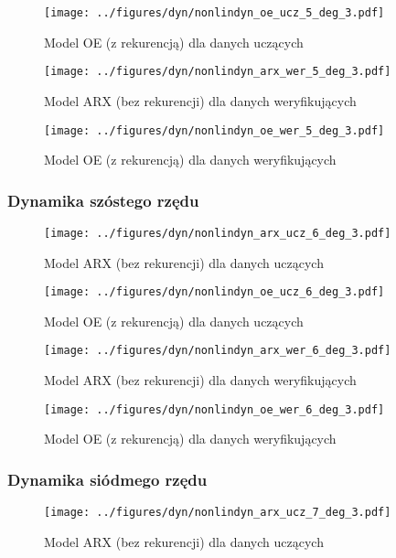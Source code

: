\documentclass[a4paper,titlepage,11pt,floatssmall]{mwrep}
\begin{document}
\begin{figure}[H]
\centering
\texttt{[image: ../figures/dyn/nonlindyn\_oe\_ucz\_5\_deg\_3.pdf]}
\caption{Model OE (z rekurencją) dla danych uczących}
\end{figure}

\begin{figure}[H]
\centering
\texttt{[image: ../figures/dyn/nonlindyn\_arx\_wer\_5\_deg\_3.pdf]}
\caption{Model ARX (bez rekurencji) dla danych weryfikujących}
\end{figure}

\begin{figure}[H]
\centering
\texttt{[image: ../figures/dyn/nonlindyn\_oe\_wer\_5\_deg\_3.pdf]}
\caption{Model OE (z rekurencją) dla danych weryfikujących}
\end{figure}

\subsubsection{Dynamika szóstego rzędu}
\begin{figure}[H]
\centering
\texttt{[image: ../figures/dyn/nonlindyn\_arx\_ucz\_6\_deg\_3.pdf]}
\caption{Model ARX (bez rekurencji) dla danych uczących}
\end{figure}

\begin{figure}[H]
\centering
\texttt{[image: ../figures/dyn/nonlindyn\_oe\_ucz\_6\_deg\_3.pdf]}
\caption{Model OE (z rekurencją) dla danych uczących}
\end{figure}

\begin{figure}[H]
\centering
\texttt{[image: ../figures/dyn/nonlindyn\_arx\_wer\_6\_deg\_3.pdf]}
\caption{Model ARX (bez rekurencji) dla danych weryfikujących}
\end{figure}

\begin{figure}[H]
\centering
\texttt{[image: ../figures/dyn/nonlindyn\_oe\_wer\_6\_deg\_3.pdf]}
\caption{Model OE (z rekurencją) dla danych weryfikujących}
\end{figure}

\subsubsection{Dynamika siódmego rzędu}
\begin{figure}[H]
\centering
\texttt{[image: ../figures/dyn/nonlindyn\_arx\_ucz\_7\_deg\_3.pdf]}
\caption{Model ARX (bez rekurencji) dla danych uczących}
\end{figure}
\end{document}

